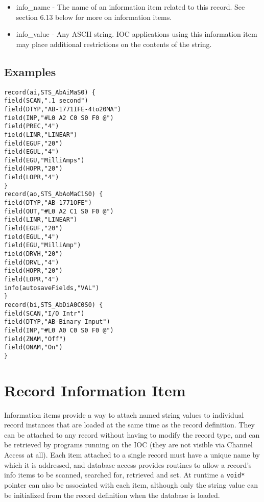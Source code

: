 \begin{itemize}\item {}info\_name - The name of an information item related to this record. See section 6.13 below for more on 
information items.

\item {}info\_value - Any ASCII string. IOC applications using this information item may place additional restrictions on 
the contents of the string.

\end{itemize}\subsection{Examples}

\begin{verbatim}record(ai,STS_AbAiMaS0) {
field(SCAN,".1 second")
field(DTYP,"AB-1771IFE-4to20MA")
field(INP,"#L0 A2 C0 S0 F0 @")
field(PREC,"4")
field(LINR,"LINEAR")
field(EGUF,"20")
field(EGUL,"4")
field(EGU,"MilliAmps")
field(HOPR,"20")
field(LOPR,"4")
}
record(ao,STS_AbAoMaC1S0) {
field(DTYP,"AB-1771OFE")
field(OUT,"#L0 A2 C1 S0 F0 @")
field(LINR,"LINEAR")
field(EGUF,"20")
field(EGUL,"4")
field(EGU,"MilliAmp")
field(DRVH,"20")
field(DRVL,"4")
field(HOPR,"20")
field(LOPR,"4")
info(autosaveFields,"VAL")
}
record(bi,STS_AbDiA0C0S0) {
field(SCAN,"I/O Intr")
field(DTYP,"AB-Binary Input")
field(INP,"#L0 A0 C0 S0 F0 @")
field(ZNAM,"Off")
field(ONAM,"On")
}
\end{verbatim}\section{Record Information Item}

Information items provide a way to attach named string values to individual record instances that are loaded at the same 
time as the record definition. They can be attached to any record without having to modify the record type, and can be 
retrieved by programs running on the IOC (they are not visible via Channel Access at all). Each item attached to a single 
record must have a unique name by which it is addressed, and database access provides routines to allow a record's info 
items to be scanned, searched for, retrieved and set. At runtime a \verb|void*| pointer can also be associated with each item, 
although only the string value can be initialized from the record definition when the database is loaded.

